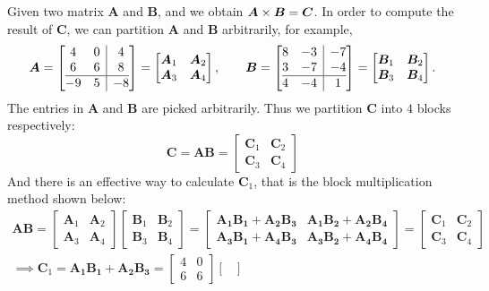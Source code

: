 \begin{enumerate}
\begin{example}
Given two matrix $\bm A$ and $\bm B$, and we obtain $\bm A\times\bm B=\bm C$. In order to
compute the result of $\bm C$, we can partition $\bm A$ and $\bm B$ arbitrarily, for example, 
\[
\bm A=\left[
\begin{array}{@{}cc|c@{}}
4&0&4\\
6&6&8\\
\hline
-9&5&-8
\end{array}
\right]
=\begin{bmatrix}
\bm A_1&\bm A_2\\\bm A_3&\bm A_4
\end{bmatrix},\qquad
\bm B=\left[
\begin{array}{@{}cc|c@{}}
8&-3&-7\\
3&-7&-4\\
\hline
4&-4&1
\end{array}
\right]=\begin{bmatrix}
\bm B_1&\bm B_2\\\bm B_3&\bm B_4
\end{bmatrix}.
\]
The entries in $\bm A$ and $\bm B$ are picked arbitrarily. Thus we partition $\bm C$ into $4$ blocks
respectively:
\[
\bm C=\bm{AB}=\begin{bmatrix}
\bm C_1&\bm C_2\\\bm C_3&\bm C_4
\end{bmatrix}
\]
And there is an effective way to calculate $\bm C_1$, that is the block multiplication method
shown below:
\begin{gather*}
\bm{AB}=\begin{bmatrix}
\bm A_1&\bm A_2\\\bm A_3&\bm A_4
\end{bmatrix}\begin{bmatrix}
\bm B_1&\bm B_2\\\bm B_3&\bm B_4
\end{bmatrix}=\begin{bmatrix}
\bm{A_1B_1}+\bm{A_2B_3}&\bm{A_1B_2}+\bm{A_2B_4}\\\bm{A_3B_1}+\bm{A_4B_3}&\bm{A_3B_2}+\bm{A_4B_4}
\end{bmatrix}
=\begin{bmatrix}
\bm C_1&\bm C_2\\\bm C_3&\bm C_4
\end{bmatrix}\\
\implies
\bm C_1=\bm{A_1B_1}+\bm{A_2B_3}
=\begin{bmatrix}
4&0\\6&6
\end{bmatrix}\begin{bmatrix}

\end{bmatrix}
\end{gather*}
\end{example}
\end{enumerate}
